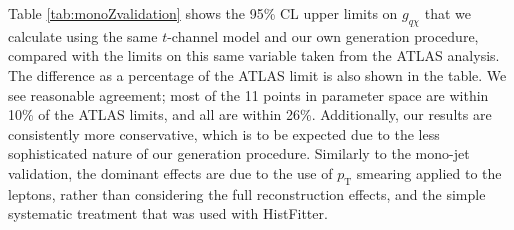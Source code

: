 \begin{flushleft}
Table \ref{tab:monoZvalidation} shows the 95\% CL upper limits on $g_{q \chi}$ that we calculate using the same $t$-channel model and our own generation procedure, compared with the limits on this same variable taken from the ATLAS analysis. The difference as a percentage of the ATLAS limit is also shown in the table. We see reasonable agreement; most of the 11 points in parameter space are within 10\% of the ATLAS limits, and all are within 26\%. Additionally, our results are consistently more conservative, which is to be expected due to the less sophisticated nature of our generation procedure. Similarly to the mono-jet validation, the dominant effects are due to the use of $p_{\mathrm{T}}$ smearing applied to the leptons, rather than considering the full reconstruction effects, and the simple systematic treatment that was used with HistFitter.

\end{flushleft}

\iffalse

\subsection{Mono-W/Z Channel}
\label{monoWZ_validation}
\begin{flushleft}
\comm{Johanna, please put your validation results here.}
\end{flushleft}

\fi
